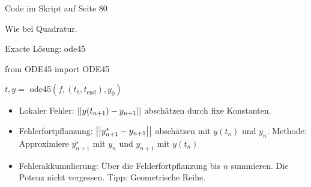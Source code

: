 Code im Skript auf Seite 80

\vspace{1\baselineskip}


Wie bei Quadratur.

Exacte Lösung: ode45

from ODE45 import ODE45

$t,y =$ ode45$(f,(t_0,t_{\text{end}}),y_0)$

\vspace{1\baselineskip}

\underline{}
\begin{itemize}
    \item Lokaler Fehler: $\left\vert\left\vert y(t_{n+1}) - y_{n+1} \right\vert\right\vert$ abschätzen durch fixe Konstanten.
    \item Fehlerfortpflanzung: $\left\vert\left\vert y_{n+1}^{\star} - y_{n+1} \right\vert\right\vert$ abschätzen mit $y(t_n)$
            und $y_n$.
            Methode: Approximiere $y_{n+1}^{\star}$ mit $y_n$ und $y_{n+1}$ mit $y(t_n)$
    \item Fehlerakkumulierung: Über die Fehlerfortpflanzung bis $n$ summieren. Die Potenz
            nicht vergessen. Tipp: Geometrische Reihe.
\end{itemize}

\vspace{1\baselineskip}

